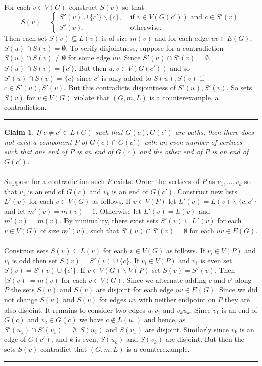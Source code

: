 \documentclass[letterpaper,12pt,oneside,onecolumn]{article}
\newenvironment{proof}{{\bf Proof:  }}{\hfill\rule{2mm}{2mm}}
\newtheorem{claim}[fact]{Claim}
\begin{document}
\begin{proof}
	\paragraph{}
	For each $v \in V(G)$ construct $S(v)$ so that
	$$S(v) = \begin{cases}
		S'(v) \cup \{c'\}\backslash \{c\}, &\text{ if } v \in V(G(c')) \text{ and } c \in S'(v) \\
		S'(v), &\text{ otherwise}.
	\end{cases}$$
	Then each set $S(v) \subseteq L(v)$ is of size $m(v)$ and for each edge $uv \in E(G)$, $S(u) \cap S(v) = \emptyset$. To verify disjointness, suppose for a contradiction $S(u) \cap S(v) \neq \emptyset$ for some edge $uv$. Since $S'(u) \cap S'(v) = \emptyset$, $S(u) \cap S(v) = \{c'\}$. But then $u,v \in V(G(c'))$ and so $S'(u) \cap S(v) = \{c\}$ since $c'$ is only added to $S(u), S(v)$ if $c \in S'(u), S'(v)$. But this contradicts disjointness of $S'(u), S'(v)$. So sets $S(v)$ for $v \in V(G)$ violate that $(G,m,L)$ is a counterexample, a contradiction.
\end{proof}
	\begin{claim}
		If $c \neq c' \in L(G)$ such that $G(c), G(c')$ are paths, then there does not exist a component $P$ of $G(c) \cap G(c')$ with an even number of vertices such that one end of $P$ is an end of $G(c)$ and the other end of $P$ is an end of $G(c')$.
	\end{claim}
	\begin{proof}
		\paragraph{} Suppose for a contradiction such $P$ exists. Order the vertices of $P$ as $v_1, \dots, v_k$ so that $v_1$ is an end of $G(c)$ and $v_k$ is an end of $G(c')$. Construct new lists $L'(v)$ for each $v \in V(G)$ as follows. If $v \in V(P)$ let $L'(v) = L(v) \backslash \{c,c'\}$ and let $m'(v) = m(v) - 1$. Otherwise let $L'(v) = L(v)$ and $m'(v) = m(v)$. By minimality, there exist sets $S'(v) \subseteq L'(v)$ for each $v \in V(G)$ of size $m'(v)$, such that $S'(u) \cap S'(v) = \emptyset$ for each $uv \in E(G)$.
		\paragraph{}
		Construct sets $S(v)\subseteq L(v)$ for each $v \in V(G)$ as follows. If $v_i \in V(P)$ and $v_i$ is odd then set $S(v) = S'(v) \cup \{c\}$. If $v_i \in V(P)$ and $v_i$ is even set $S(v) = S'(v) \cup \{c'\}$. If $v \in V(G)\backslash V(P)$ set $S(v) = S'(v)$. Then $|S(v)| = m(v)$ for each $v \in V(G)$. Since we alternate adding $c$ and $c'$ along $P$ the sets $S(u)$ and $S(v)$ are disjoint for each edge $uv \in E(G)$. Since we did not change $S(u)$ and $S(v)$ for edges $uv$ with neither endpoint on $P$ they are also disjoint. It remains to consider two edges $u_1v_1$ and $v_ku_k$. Since $v_1$ is an end of $G(c)$ and $v_2 \in G(c)$ we have $c \not\in L(u_1)$ and hence, as $S'(u_1) \cap S'(v_1) = \emptyset$, $S(u_1)$ and $S(v_1)$ are disjoint. Similarly since $v_k$ is an edge of $G(c')$, and $k$ is even, $S(u_k)$ and $S(v_k)$ are disjoint. But then the sets $S(v)$ contradict that $(G,m,L)$ is a counterexample.
	\end{proof}
\end{document}
